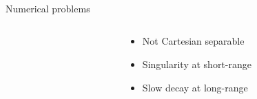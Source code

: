 \documentclass[mathserif, 10pt]{beamer}
\begin{document}
\begin{frame}
\begin{equation}
    \end{equation}
    \ \\
    \ \\
    \ \\
    \pause
    Numerical problems
    \begin{columns}
    \begin{column}{.28\textwidth}
    \ \\
    \end{column}
    \begin{column}{.72\textwidth}
    \begin{itemize}
	\item Not Cartesian separable
	\item Singularity at short-range
	\item Slow decay at long-range
    \end{itemize}
    \end{column}
    \end{columns}
\end{frame}
\end{document}
